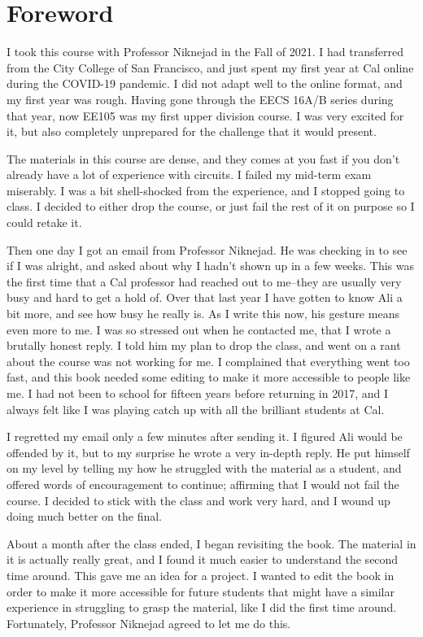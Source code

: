 \section*{Foreword}
I took this course with Professor Niknejad in the Fall of 2021.  I had transferred from the City College of San Francisco, and just spent my first year at Cal online during the COVID-19 pandemic.  I did not adapt well to the online format, and my first year was rough.  Having gone through the EECS 16A/B series during that year, now EE105 was my first upper division course.  I was very excited for it, but also completely unprepared for the challenge that it would present.

The materials in this course are dense, and they comes at you fast if you don't already have a lot of experience with circuits.  I failed my mid-term exam miserably.  I was a bit shell-shocked from the experience, and I stopped going to class.  I decided to either drop the course, or just fail the rest of it on purpose so I could retake it.

Then one day I got an email from Professor Niknejad.  He was checking in to see if I was alright, and asked about why I hadn't shown up in a few weeks.  This was the first time that a Cal professor had reached out to me--they are usually very busy and hard to get a hold of.  Over that last year I have gotten to know Ali a bit more, and see how busy he really is.  As I write this now, his gesture means even more to me.  I was so stressed out when he contacted me, that I wrote a brutally honest reply.  I told him my plan to drop the class, and went on a rant about the course was not working for me.  I complained that everything went too fast, and this book needed some editing to make it more accessible to people like me.  I had not been to school for fifteen years before returning in 2017, and I always felt like I was playing catch up with all the brilliant students at Cal.

I regretted my email only a few minutes after sending it.  I figured Ali would be offended by it, but to my surprise he wrote a very in-depth reply.  He put himself on my level by telling my how he struggled with the material as a student, and offered words of encouragement to continue; affirming that I would not fail the course.  I decided to stick with the class and work very hard, and I wound up doing much better on the final.

About a month after the class ended, I began revisiting the book.  The material in it is actually really great, and I found it much easier to understand the second time around.  This gave me an idea for a project.  I wanted to edit the book in order to make it more accessible for future students that might have a similar experience in struggling to grasp the material, like I did the first time around.  Fortunately, Professor Niknejad agreed to let me do this.

